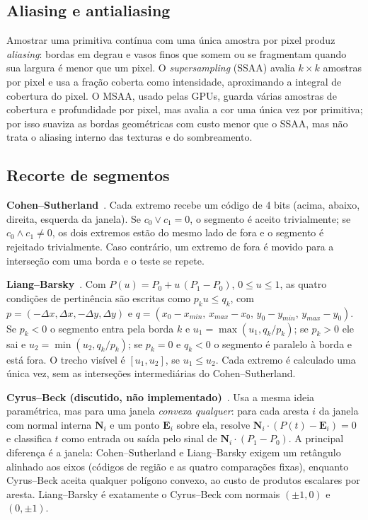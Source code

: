 \documentclass[11pt, a4paper]{article}
\begin{document}
\subsection{Aliasing e antialiasing}
Amostrar uma primitiva contínua com uma única amostra por pixel produz \emph{aliasing}: bordas em degrau e vasos finos que somem ou se fragmentam quando sua largura é menor que um pixel. O \emph{supersampling} (SSAA) avalia $k\times k$ amostras por pixel e usa a fração coberta como intensidade, aproximando a integral de cobertura do pixel. O MSAA, usado pelas GPUs, guarda várias amostras de cobertura e profundidade por pixel, mas avalia a cor uma única vez por primitiva; por isso suaviza as bordas geométricas com custo menor que o SSAA, mas não trata o aliasing interno das texturas e do sombreamento.

\subsection{Recorte de segmentos}
\textbf{Cohen--Sutherland}~\cite{foley}. Cada extremo recebe um código de 4 bits (acima, abaixo, direita, esquerda da janela). Se $c_0 \lor c_1 = 0$, o segmento é aceito trivialmente; se $c_0 \land c_1 \neq 0$, os dois extremos estão do mesmo lado de fora e o segmento é rejeitado trivialmente. Caso contrário, um extremo de fora é movido para a interseção com uma borda e o teste se repete.

\textbf{Liang--Barsky}~\cite{liang1984}. Com $P(u)=P_0+u\,(P_1-P_0)$, $0\le u\le1$, as quatro condições de pertinência são escritas como $p_k u \le q_k$, com $p=(-\Delta x, \Delta x, -\Delta y, \Delta y)$ e $q=(x_0-x_{min},\, x_{max}-x_0,\, y_0-y_{min},\, y_{max}-y_0)$. Se $p_k<0$ o segmento entra pela borda $k$ e $u_1=\max(u_1, q_k/p_k)$; se $p_k>0$ ele sai e $u_2=\min(u_2,q_k/p_k)$; se $p_k=0$ e $q_k<0$ o segmento é paralelo à borda e está fora. O trecho visível é $[u_1,u_2]$, se $u_1\le u_2$. Cada extremo é calculado uma única vez, sem as interseções intermediárias do Cohen--Sutherland.

\textbf{Cyrus--Beck (discutido, não implementado)}~\cite{cyrus1978}. Usa a mesma ideia paramétrica, mas para uma janela \emph{convexa qualquer}: para cada aresta $i$ da janela com normal interna $\mathbf{N}_i$ e um ponto $\mathbf{E}_i$ sobre ela, resolve $\mathbf{N}_i\cdot(P(t)-\mathbf{E}_i)=0$ e classifica $t$ como entrada ou saída pelo sinal de $\mathbf{N}_i\cdot(P_1-P_0)$. A principal diferença é a janela: Cohen--Sutherland e Liang--Barsky exigem um retângulo alinhado aos eixos (códigos de região e as quatro comparações fixas), enquanto Cyrus--Beck aceita qualquer polígono convexo, ao custo de produtos escalares por aresta. Liang--Barsky é exatamente o Cyrus--Beck com normais $(\pm1,0)$ e $(0,\pm1)$.
\end{document}
